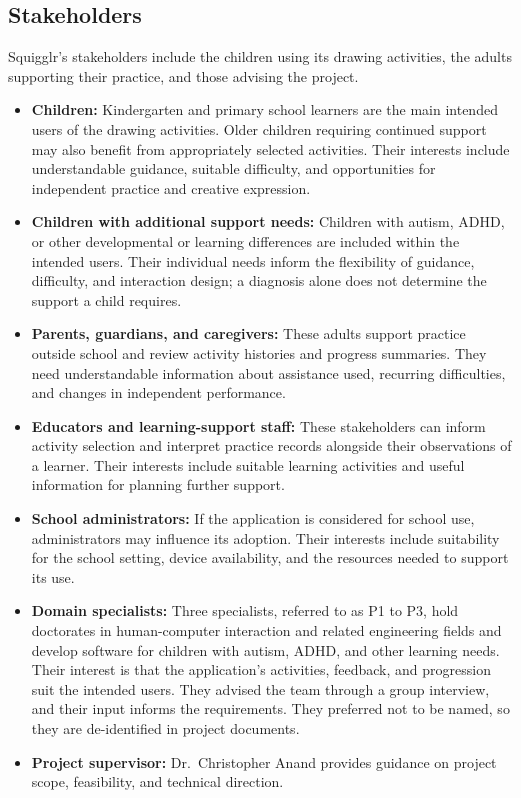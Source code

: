 \documentclass{article}
\begin{document}
\subsection{Stakeholders}

Squigglr's stakeholders include the children using its drawing
activities, the adults supporting their practice, and those advising
the project.

\begin{itemize}
    \item \textbf{Children:}
    Kindergarten and primary school learners are the main intended
    users of the drawing activities. Older children requiring
    continued support may also benefit from appropriately selected
    activities. Their interests include understandable guidance,
    suitable difficulty, and opportunities for independent practice
    and creative expression.

    \item \textbf{Children with additional support needs:}
    Children with autism, ADHD, or other developmental or learning
    differences are included within the intended users. Their
    individual needs inform the flexibility of guidance, difficulty,
    and interaction design; a diagnosis alone does not determine
    the support a child requires.

    \item \textbf{Parents, guardians, and caregivers:}
    These adults support practice outside school and review activity
    histories and progress summaries. They need understandable
    information about assistance used, recurring difficulties, and
    changes in independent performance.

    \item \textbf{Educators and learning-support staff:}
    These stakeholders can inform activity selection and interpret
    practice records alongside their observations of a learner.
    Their interests include suitable learning activities and useful
    information for planning further support.

    \item \textbf{School administrators:}
    If the application is considered for school use, administrators
    may influence its adoption. Their interests include suitability
    for the school setting, device availability, and the resources
    needed to support its use.

    \item \textbf{Domain specialists:}
    Three specialists, referred to as P1 to P3, hold doctorates in
    human-computer interaction and related engineering fields and
    develop software for children with autism, ADHD, and other
    learning needs. Their interest is that the application's
    activities, feedback, and progression suit the intended users. They advised the team through a group
    interview, and their input informs the requirements. They
    preferred not to be named, so they are de-identified in project
    documents.

    \item \textbf{Project supervisor:}
    Dr.~Christopher Anand provides guidance on project scope,
    feasibility, and technical direction.
\end{itemize}
\end{document}
